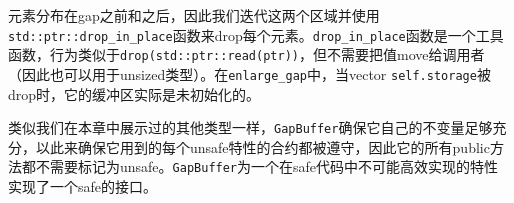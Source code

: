 元素分布在gap之前和之后，因此我们迭代这两个区域并使用\texttt{std::ptr::drop\_in\_place}函数来drop每个元素。\texttt{drop\_in\_place}函数是一个工具函数，行为类似于\texttt{drop(std::ptr::read(ptr))}，但不需要把值move给调用者（因此也可以用于unsized类型）。在\texttt{enlarge\_gap}中，当vector \texttt{self.storage}被drop时，它的缓冲区实际是未初始化的。

类似我们在本章中展示过的其他类型一样，\texttt{GapBuffer}确保它自己的不变量足够充分，以此来确保它用到的每个unsafe特性的合约都被遵守，因此它的所有public方法都不需要标记为unsafe。\texttt{GapBuffer}为一个在safe代码中不可能高效实现的特性实现了一个safe的接口。

